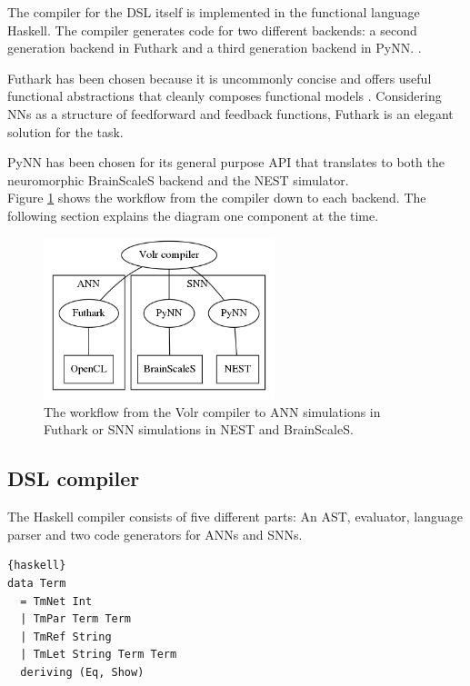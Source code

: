 The compiler for the \gls{DSL} itself is implemented in the functional language
Haskell.
The compiler generates code for two different backends: a second generation
backend in Futhark  and a third generation backend in PyNN.
.

Futhark has been chosen because it is uncommonly concise and offers
useful functional abstractions that cleanly composes functional
models \cite{Henriksen2017}.
Considering \gls{NN}s as a structure of feedforward and feedback functions,
Futhark is an elegant solution for the task.

PyNN has been chosen for its general purpose API that translates to both the
neuromorphic BrainScaleS  backend and the NEST 
 simulator.
\\[0.2cm]
Figure \ref{fig:volr-architecture} shows the workflow from the compiler
down to each backend.
The following section explains the diagram one component at the time.

\begin{figure}
  \centering
  \includegraphics[width=0.6\textwidth]{images/volr-architecture.png}
  \caption{The workflow from the Volr compiler to 
    \gls{ANN} simulations in Futhark or \gls{SNN} simulations in \gls{NEST} and
    \gls{BrainScaleS}.
  }
  \label{fig:volr-architecture}
\end{figure}

\subsection{DSL compiler}
The Haskell compiler consists of five different parts:
An \gls{AST}, evaluator, language parser and two
code generators for \gls{ANN}s and \gls{SNN}s.

\lstset{caption=The Volr AST in Haskell., mathescape=false,showstringspaces=false}
\begin{lstlisting}{haskell}
data Term
  = TmNet Int 
  | TmPar Term Term                                                                                                                                                                                             
  | TmRef String                                                                                                                                                                                                
  | TmLet String Term Term                                                                                                                                                                                      
  deriving (Eq, Show)  
\end{lstlisting} \label{code:term}

